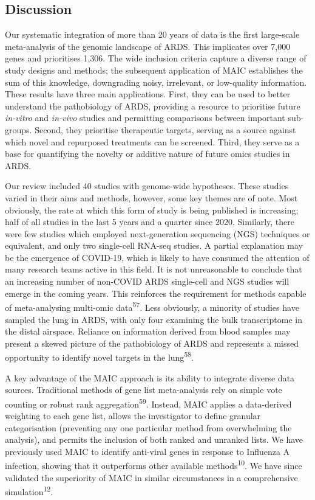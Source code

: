 \documentclass[
  11,
  a4paper,
]{article}
\begin{document}
\newpage

\subsection{Discussion}\label{discussion}

Our systematic integration of more than 20 years of data is the first
large-scale meta-analysis of the genomic landscape of ARDS. This
implicates over 7,000 genes and prioritises 1,306. The wide inclusion
criteria capture a diverse range of study designs and methods; the
subsequent application of MAIC establishes the sum of this knowledge,
downgrading noisy, irrelevant, or low-quality information. These results
have three main applications. First, they can be used to better
understand the pathobiology of ARDS, providing a resource to prioritise
future \emph{in-vitro} and \emph{in-vivo} studies and permitting
comparisons between important sub-groups. Second, they prioritise
therapeutic targets, serving as a source against which novel and
repurposed treatments can be screened. Third, they serve as a base for
quantifying the novelty or additive nature of future omics studies in
ARDS.

Our review included 40 studies with genome-wide hypotheses. These
studies varied in their aims and methods, however, some key themes are
of note. Most obviously, the rate at which this form of study is being
published is increasing; half of all studies in the last 5 years and a
quarter since 2020. Similarly, there were few studies which employed
next-generation sequencing (NGS) techniques or equivalent, and only two
single-cell RNA-seq studies. A partial explanation may be the emergence
of COVID-19, which is likely to have consumed the attention of many
research teams active in this field. It is not unreasonable to conclude
that an increasing number of non-COVID ARDS single-cell and NGS studies
will emerge in the coming years. This reinforces the requirement for
methods capable of meta-analysing multi-omic data\textsuperscript{57}.
Less obviously, a minority of studies have sampled the lung in ARDS,
with only four examining the bulk transcriptome in the distal airspace.
Reliance on information derived from blood samples may present a skewed
picture of the pathobiology of ARDS and represents a missed opportunity
to identify novel targets in the lung\textsuperscript{58}.

A key advantage of the MAIC approach is its ability to integrate diverse
data sources. Traditional methods of gene list meta-analysis rely on
simple vote counting or robust rank aggregation\textsuperscript{59}.
Instead, MAIC applies a data-derived weighting to each gene list, allows
the investigator to define granular categorisation (preventing any one
particular method from overwhelming the analysis), and permits the
inclusion of both ranked and unranked lists. We have previously used
MAIC to identify anti-viral genes in response to Influenza A infection,
showing that it outperforms other available methods\textsuperscript{10}.
We have since validated the superiority of MAIC in similar circumstances
in a comprehensive simulation\textsuperscript{12}.
\end{document}
